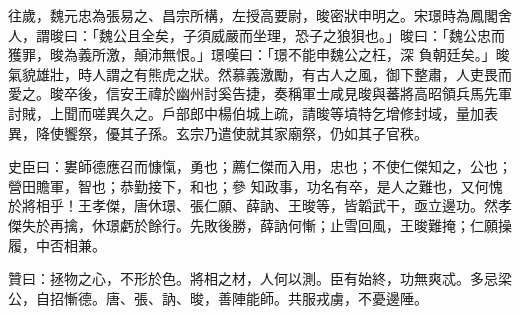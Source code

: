 \begin{pinyinscope}
 往歲，魏元忠為張易之、昌宗所構，左授高要尉，晙密狀申明之。宋璟時為鳳閣舍人，謂晙曰：「魏公且全矣，子須威嚴而坐理，恐子之狼狽也。」晙曰：「魏公忠而獲罪，晙為義所激，顛沛無恨。」璟嘆曰：「璟不能申魏公之枉，深
 負朝廷矣。」晙氣貌雄壯，時人謂之有熊虎之狀。然慕義激勵，有古人之風，御下整肅，人吏畏而愛之。晙卒後，信安王禕於幽州討奚告捷，奏稱軍士咸見晙與蕃將高昭領兵馬先軍討賊，上聞而嗟異久之。戶部郎中楊伯城上疏，請晙等墳特乞增修封域，量加表異，降使饗祭，優其子孫。玄宗乃遣使就其家廟祭，仍如其子官秩。



 史臣曰：婁師德應召而慷愾，勇也；薦仁傑而入用，忠也；不使仁傑知之，公也；營田贍軍，智也；恭勤接下，和也；參
 知政事，功名有卒，是人之難也，又何愧於將相乎！王孝傑，唐休璟、張仁願、薛訥、王晙等，皆韜武干，亟立邊功。然孝傑失於再擒，休璟虧於餘行。先敗後勝，薛訥何慚；止雪回風，王晙難掩；仁願操履，中否相兼。



 贊曰：拯物之心，不形於色。將相之材，人何以測。臣有始終，功無爽忒。多忌梁公，自招慚德。唐、張、訥、晙，善陣能師。共服戎虜，不憂邊陲。



\end{pinyinscope}